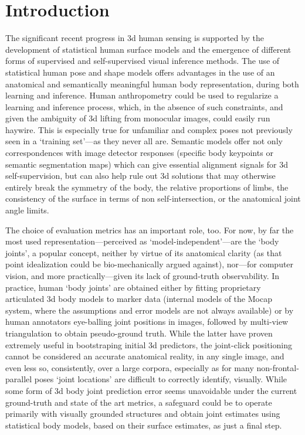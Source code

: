 \documentclass[10pt,twocolumn,letterpaper]{article}
\begin{document}
\section{Introduction}

The significant recent progress in 3d human sensing is supported by the development of statistical human surface models 
and the emergence of different forms of supervised and self-supervised visual inference methods.
The use of statistical human pose and shape models offers advantages in the use of an anatomical and semantically meaningful human body representation, during both learning and inference. Human anthropometry could be used to regularize a learning and inference process, which, in the absence of such constraints, and given the ambiguity of 3d lifting from monocular images, could easily run haywire. This is especially true for unfamiliar and complex poses not previously seen in a `training set'---as they never all are. Semantic models offer not only correspondences with image detector responses (specific body keypoints or semantic segmentation maps) which can give essential alignment signals for 3d self-supervision, but can also help rule out 3d solutions that may otherwise entirely break the symmetry of the body, the relative proportions of limbs, the consistency of the surface in terms of non self-intersection, or the anatomical joint angle limits. 

The choice of evaluation metrics has an important role, too. For now, by far the most used representation---perceived as `model-independent'---are the `body joints', a popular concept, neither by virtue of its anatomical clarity (as that point idealization could be bio-mechanically argued against), nor---for computer vision, and more practically---given its lack of ground-truth observability. In practice, human `body joints' are obtained either by fitting proprietary articulated 3d body models to marker data (internal models of the Mocap system, where the assumptions and error models are not always available) or by human annotators eye-balling joint positions in images, followed by multi-view triangulation to obtain pseudo-ground truth. While the latter have proven extremely useful in bootstraping initial 3d predictors, the joint-click positioning cannot be considered an accurate anatomical reality, in any single image, and even less so, consistently, over a large corpora, especially as for many non-frontal-parallel  poses `joint locations' are difficult to correctly identify, visually. 
While some form of 3d body joint prediction error seems unavoidable under the current ground-truth and state of the art metrics, a safeguard could be to operate primarily with visually grounded structures and obtain joint estimates using statistical body models, based on their surface estimates, as just a final step. 
\end{document}
